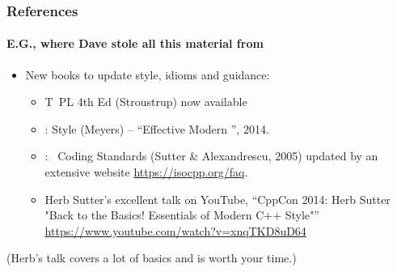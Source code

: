 \begin{frame}[fragile]
\frametitle{ References}
\framesubtitle{E.G., where Dave stole all this material from}
\begin{itemize}
  \item New books to update style, idioms and guidance:
    \begin{itemize}
    \item {} T\CC~PL 4th Ed (Stroustrup) now available

    \item {}: Style (Meyers) -- ``Effective Modern
      \CC'',  2014.

    \item {}: \CC\ Coding Standards (Sutter \&
    Alexandrescu, 2005) updated by an extensive website \url{https://isocpp.org/faq}.

  \item  Herb Sutter's excellent talk on YouTube, ``CppCon 2014: Herb Sutter "Back to the Basics!
    Essentials of Modern C++ Style"'' \url{https://www.youtube.com/watch?v=xnqTKD8uD64}

    \end{itemize}


\end{itemize}

(Herb's talk covers a lot of basics and is worth your time.)

\end{frame}






